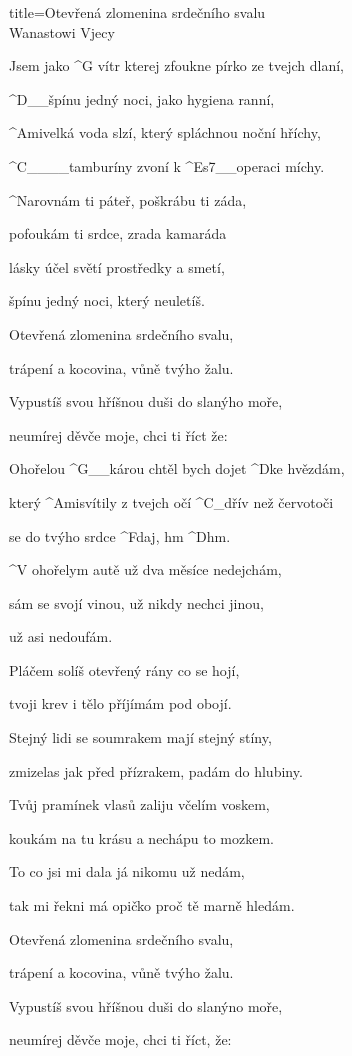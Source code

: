 \begin{song}{title=\predtitle\centering Otevřená zlomenina srdečního svalu \\\large Wanastowi Vjecy \vspace*{-0.3cm}}  %
\begin{centerjustified}

\sloka 
	Jsem jako ^{G\,\,}vítr kterej zfoukne pírko ze tvejch dlaní,

	^{D{\color{white}\_\_}}špínu jedný noci, jako hygiena ranní,

	^{Ami}velká voda slzí, který spláchnou noční hříchy, 

	^{C{\color{white}\_\_\_\_}}tamburíny zvoní k ^{Es7{\color{white}\_\_}}operaci míchy.
	
	^{\phantom{.}}Narovnám ti páteř, poškrábu ti záda, 
	
	pofoukám ti srdce, zrada kamaráda

	lásky účel světí prostředky a smetí, 
	
	špínu jedný noci, který neuletíš.

	Otevřená zlomenina srdečního svalu, 
	
	trápení a kocovina, vůně tvýho žalu.
	
	Vypustíš svou hříšnou duši do slanýho moře, 
	
	neumírej děvče moje, chci ti říct že:


	Ohořelou ^{G{\color{white}\_\_}}károu chtěl bych dojet ^{D}ke hvězdám,

	který ^{Ami}svítily z tvejch očí ^{C{\color{white}\_}}dřív než červotoči 

	se do tvýho srdce ^{F}daj, hm ^{D}hm.
	
	^{\phantom{.}}V ohořelym autě už dva měsíce nedejchám,
	
	sám se svojí vinou, už nikdy nechci jinou, 
	
	už asi nedoufám.

\sloka
	Pláčem solíš otevřený rány co se hojí, 
	
	tvoji krev i tělo příjímám pod obojí.

	Stejný lidi se soumrakem mají stejný stíny, 
	
	zmizelas jak před přízrakem, padám do hlubiny.
	
	Tvůj pramínek vlasů zaliju včelím voskem, 
	
	koukám na tu krásu a nechápu to mozkem.
	
	To co jsi mi dala já nikomu už nedám, 
	
	tak mi řekni má opičko proč tě marně hledám.

	Otevřená zlomenina srdečního svalu, 
	
	trápení a kocovina, vůně tvýho žalu.
	
	Vypustíš svou hříšnou duši do slanýno moře, 

	neumírej děvče moje, chci ti říct, že:




\end{centerjustified}
\setcounter{Slokočet}{0}
\end{song}
